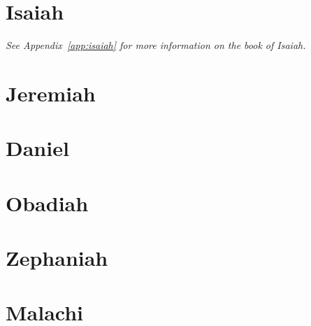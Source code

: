 \documentclass[twoside]{book}
\newcommand\englishchaptertitle{}
\newcommand\hebrewchaptertitle{}
\newcommand\book[2]{%
    \chapter[#1\hfill#2~~~]{#1}%
    \renewcommand\englishchaptertitle{#1}%
    \renewcommand\hebrewchaptertitle{#2}%
    \thispagestyle{empty}%
}
\newcommand\Hebrew[1]{{\sblh #1}}
\begin{document}
    \book{Isaiah}{\Hebrew{ישעה}}
    {\noindent\textit{\small See Appendix~\ref{app:isaiah} for more information on the book of Isaiah.}}
    
    
    
    
    
    
    
    \book{Jeremiah}{\Hebrew{ירמיה}}
    
    
    \book{Daniel}{\Hebrew{דניאל}}
    
    
    
    
    \book{Obadiah}{\Hebrew{עבדיה}}
    
    
    \book{Zephaniah}{\Hebrew{צפניה}}
    
    
    \book{Malachi}{\Hebrew{מלאכי}}
    
    
    
    ~\clearpage\thispagestyle{empty}
    \appendix
    
    
    
    
    
    
\end{document}

